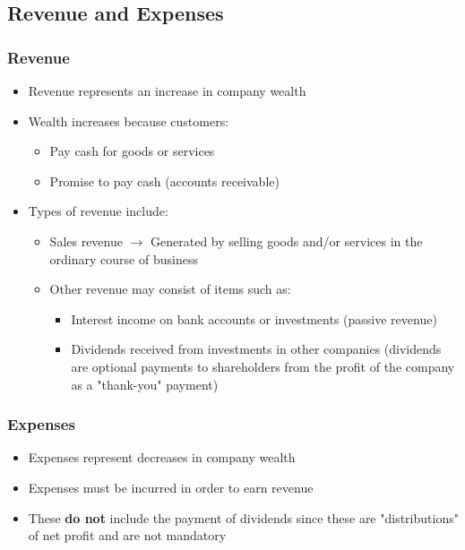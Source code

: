 \documentclass{article}
\begin{document}
	\subsection{Revenue and Expenses}

		\subsubsection{Revenue}
			\begin{itemize}
				\item Revenue represents an increase in company wealth
				\item Wealth increases because customers:
					\begin{itemize}
						\item Pay cash for goods or services
						\item Promise to pay cash (accounts receivable)
					\end{itemize}
				\item Types of revenue include:
					\begin{itemize}
						\item Sales revenue $\rightarrow$ Generated by selling goods and/or services in the ordinary course of business
						\item Other revenue may consist of items such as:
							\begin{itemize}
								\item Interest income on bank accounts or investments (passive revenue)
								\item Dividends received from investments in other companies (dividends are optional payments to shareholders from the profit of the company as a "thank-you" payment)
							\end{itemize}
					\end{itemize}
			\end{itemize}

		\subsubsection{Expenses}

			\begin{itemize}
				\item Expenses represent decreases in company wealth
				\item Expenses must be incurred in order to earn revenue
				\item These \textbf{do not} include the payment of dividends since these are "distributions" of net profit and are \colorbox{pastel_red}{not} mandatory
			\end{itemize}
\end{document}
